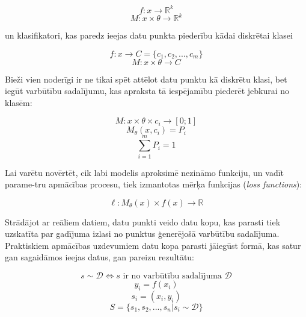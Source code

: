\documentclass[12pt, a4paper]{article}
\numberwithin{equation}{section} %
\begin{document}
\begin{equation} 
    f:x \rightarrow \mathbb{R}^k
\end{equation}
\begin{equation} 
    M: x \times \theta \rightarrow \mathbb{R}^k
\end{equation}

un klasifikatori, kas paredz ieejas datu punkta piederību kādai diskrētai klasei

\begin{equation} 
    f:x \rightarrow C = \lbrace c_1, c_2, ..., c_m \rbrace
\end{equation}
\begin{equation} 
     M: x \times \theta \rightarrow C
\end{equation}

Bieži vien noderīgi ir ne tikai spēt attēlot datu punktu kā diskrētu klasi, bet iegūt varbūtību sadalījumu, kas apraksta tā iespējamību piederēt jebkurai no klasēm:

\begin{equation} 
    M: x \times \theta \times c_i \rightarrow [0; 1]
\end{equation}
\begin{equation} 
    M_{\theta}(x, c_i) = P_i
\end{equation}
\begin{equation} 
    \sum_{i=1}^m P_i = 1
\end{equation}

Lai varētu novērtēt, cik labi modelis aproksimē nezināmo funkciju, un vadīt parame-tru apmācības procesu, tiek izmantotas mērķa funkcijas (\textit{loss functions})\cite{notation}:

\begin{equation} 
    \ell: M_{\theta}(x) \times f(x) \rightarrow \mathbb{R}
\end{equation}

Strādājot ar reāliem datiem, datu punkti veido datu kopu, kas parasti tiek uzskatīta par gadījuma izlasi no punktus ģenerējošā varbūtību sadalījuma. Praktiskiem apmācības uzdevumiem datu kopa parasti jāiegūst formā, kas satur gan sagaidāmos ieejas datus, gan pareizu rezultātu:

\begin{equation} 
    s \sim \mathcal{D} \Leftrightarrow s \text{ ir no varbūtību sadalījuma } \mathcal{D}
\end{equation}
\begin{equation} 
    y_i = f(x_i)
\end{equation}
\begin{equation} 
    s_i = (x_i, y_i)
\end{equation}
\begin{equation} 
    S = \lbrace s_1, s_2, ..., s_n \vert s_i \sim \mathcal{D}\rbrace
\end{equation}
\end{document}
